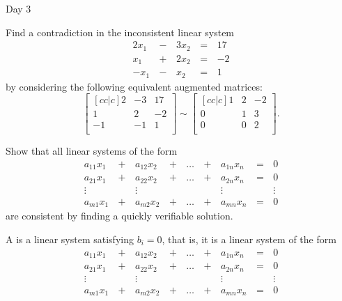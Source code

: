 \begin{applicationActivities}{Day 3}
\begin{activity}{10} %
  Find a contradiction in the inconsistent linear system
    \begin{alignat*}{4}
      2x_1 &\,-\,& 3x_2 &\,=\,& 17 \\
       x_1 &\,+\,& 2x_2 &\,=\,& -2 \\
      -x_1 &\,-\,&  x_2 &\,=\,& 1
    \end{alignat*}
  by considering the following equivalent augmented matrices:
  \[
    \begin{bmatrix}[cc|c]
       2 & -3 & 17 \\
       1 &  2 & -2 \\
      -1 & -1 &  1 \\
    \end{bmatrix}\sim
    \begin{bmatrix}[cc|c]
       1 &  2 & -2 \\
       0 &  1 &  3 \\
       0 &  0 &  2 \\
    \end{bmatrix}
  .\]
\end{activity}

\begin{activity}{5}
  Show that all linear systems of the form
  \begin{alignat*}{5}
    a_{11}x_1 &\,+\,& a_{12}x_2 &\,+\,& \dots  &\,+\,& a_{1n}x_n &\,=\,& 0 \\
    a_{21}x_1 &\,+\,& a_{22}x_2 &\,+\,& \dots  &\,+\,& a_{2n}x_n &\,=\,& 0 \\
     \vdots&  &\vdots&   &&  &\vdots&&\vdots  \\
    a_{m1}x_1 &\,+\,& a_{m2}x_2 &\,+\,& \dots  &\,+\,& a_{mn}x_n &\,=\,& 0
  \end{alignat*}
  are consistent by finding a
  quickly verifiable solution.
\end{activity}

\begin{definition}
  A  is a linear system satisfying \(b_i=0\), that is,
  it is a linear system of the form
  \begin{alignat*}{5}
    a_{11}x_1 &\,+\,& a_{12}x_2 &\,+\,& \dots  &\,+\,& a_{1n}x_n &\,=\,& 0 \\
    a_{21}x_1 &\,+\,& a_{22}x_2 &\,+\,& \dots  &\,+\,& a_{2n}x_n &\,=\,& 0 \\
     \vdots&  &\vdots&   &&  &\vdots&&\vdots  \\
    a_{m1}x_1 &\,+\,& a_{m2}x_2 &\,+\,& \dots  &\,+\,& a_{mn}x_n &\,=\,& 0
  \end{alignat*}
\end{definition}


\end{applicationActivities}
